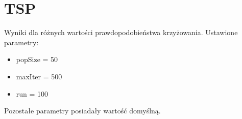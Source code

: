 \section{TSP}

Wyniki dla różnych wartości prawdopodobieństwa krzyżowania.
Ustawione parametry:

\begin{itemize}
	\item popSize = 50
	\item maxIter = 500
	\item run = 100
\end{itemize}

Pozostałe parametry posiadały wartość domyślną.